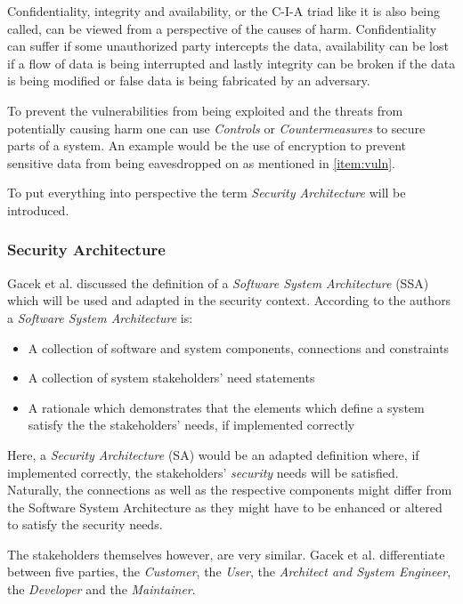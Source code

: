 Confidentiality, integrity and availability, or the C-I-A triad like it is also being called, can be viewed from a perspective of the causes of harm. Confidentiality can suffer if some unauthorized party intercepts the data, availability can be lost if a flow of data is being interrupted and lastly integrity can be broken if the data is being modified or false data is being fabricated by an adversary.

To prevent the vulnerabilities from being exploited and the threats from potentially causing harm one can use \textit{Controls} or \textit{Countermeasures} to secure parts of a system. An example would be the use of encryption to prevent sensitive data from being eavesdropped on as mentioned in \ref{item:vuln}. 

To put everything into perspective the term \textit{Security Architecture} will be introduced.

\subsubsection{Security Architecture}

Gacek et al. discussed the definition of a \textit{Software System Architecture} (SSA) which will be used and adapted in the security context. According to the authors a \textit{Software System Architecture} is:

\begin{itemize}
\item A collection of software and system components, connections and constraints
\item A collection of system stakeholders' need statements
\item A rationale which demonstrates that the elements which define a system satisfy the the stakeholders' needs, if implemented correctly
\end{itemize}

Here, a \textit{Security Architecture} (SA) would be an adapted definition where, if implemented correctly, the stakeholders' \textit{security} needs will be satisfied. Naturally, the connections as well as the respective components might differ from the Software System Architecture as they might have to be enhanced or altered to satisfy the security needs. 

The stakeholders themselves however, are very similar. Gacek et al. differentiate between five parties, the \textit{Customer}, the \textit{User}, the \textit{Architect and System Engineer}, the \textit{Developer} and the \textit{Maintainer}. 


